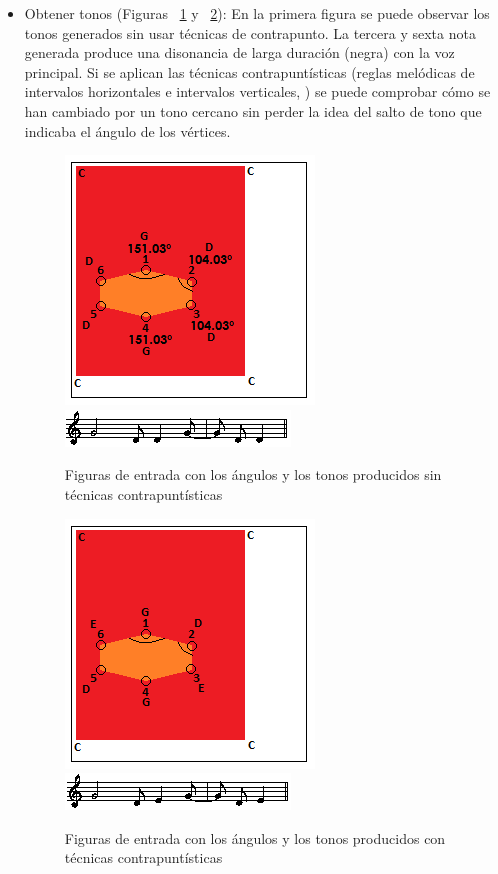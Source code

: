 \begin{itemize}
	\item Obtener tonos (Figuras ~\ref{fig:Figura3Voz2} y ~\ref{fig:Figura4Voz2}): En la primera figura se puede observar los tonos generados sin usar técnicas de contrapunto. La tercera y sexta nota generada produce una disonancia de larga duración (negra) con la voz principal. Si se aplican las técnicas contrapuntísticas (reglas melódicas de intervalos horizontales e intervalos verticales, \cite{Contrapunto}) se puede comprobar cómo se han cambiado por un tono cercano sin perder la idea del salto de tono que indicaba el ángulo de los vértices.

		\begin{figure}[!htbp]
		\centering
		\hspace*{0.0in}
		\includegraphics[scale=1]{graphics/simpletest4-F3.png}
		\includegraphics[scale=1]{graphics/simpletest4-F3-MEL2partitura.png}
		\caption{Figuras de entrada con los ángulos y los tonos producidos sin técnicas contrapuntísticas}
		\label{fig:Figura3Voz2}
		\end{figure}

		\begin{figure}[!htbp]
		\centering
		\hspace*{0.0in}
		\includegraphics[scale=1]{graphics/simpletest4-F3_2.png}
		\includegraphics[scale=1]{graphics/simpletest4-F3_2-MEL2partitura.png}
		\caption{Figuras de entrada con los ángulos y los tonos producidos con técnicas contrapuntísticas}
		\label{fig:Figura4Voz2}
		\end{figure}


\end{itemize}
